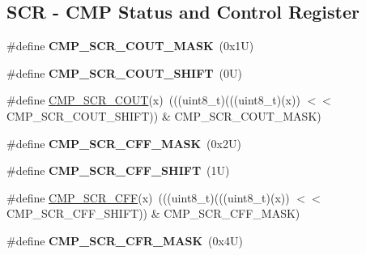 \subsection*{S\+CR -\/ C\+MP Status and Control Register}
\begin{DoxyCompactItemize}
\item 
\mbox{\label{group___c_m_p___register___masks_ga024aec72a28ecdc04a1441cd7a3af23a}} 
\#define {\bfseries C\+M\+P\+\_\+\+S\+C\+R\+\_\+\+C\+O\+U\+T\+\_\+\+M\+A\+SK}~(0x1\+U)
\item 
\mbox{\label{group___c_m_p___register___masks_gaa508076192a6b9aed5c4d46282c64394}} 
\#define {\bfseries C\+M\+P\+\_\+\+S\+C\+R\+\_\+\+C\+O\+U\+T\+\_\+\+S\+H\+I\+FT}~(0\+U)
\item 
\#define \mbox{\hyperlink{group___c_m_p___register___masks_gaff457b5ca15d0bc33dad1e49ac9793cf}{C\+M\+P\+\_\+\+S\+C\+R\+\_\+\+C\+O\+UT}}(x)~(((uint8\+\_\+t)(((uint8\+\_\+t)(x)) $<$$<$ C\+M\+P\+\_\+\+S\+C\+R\+\_\+\+C\+O\+U\+T\+\_\+\+S\+H\+I\+FT)) \& C\+M\+P\+\_\+\+S\+C\+R\+\_\+\+C\+O\+U\+T\+\_\+\+M\+A\+SK)
\item 
\mbox{\label{group___c_m_p___register___masks_gaab44e3da0576b12dd809881323944a1c}} 
\#define {\bfseries C\+M\+P\+\_\+\+S\+C\+R\+\_\+\+C\+F\+F\+\_\+\+M\+A\+SK}~(0x2\+U)
\item 
\mbox{\label{group___c_m_p___register___masks_ga076d455f0d5bdad02282cbcce6e04c01}} 
\#define {\bfseries C\+M\+P\+\_\+\+S\+C\+R\+\_\+\+C\+F\+F\+\_\+\+S\+H\+I\+FT}~(1\+U)
\item 
\#define \mbox{\hyperlink{group___c_m_p___register___masks_ga3cf21e20fb83bffcac05736f6f7c797d}{C\+M\+P\+\_\+\+S\+C\+R\+\_\+\+C\+FF}}(x)~(((uint8\+\_\+t)(((uint8\+\_\+t)(x)) $<$$<$ C\+M\+P\+\_\+\+S\+C\+R\+\_\+\+C\+F\+F\+\_\+\+S\+H\+I\+FT)) \& C\+M\+P\+\_\+\+S\+C\+R\+\_\+\+C\+F\+F\+\_\+\+M\+A\+SK)
\item 
\mbox{\label{group___c_m_p___register___masks_ga876bfa2799338c6b10b152940d25c4a7}} 
\#define {\bfseries C\+M\+P\+\_\+\+S\+C\+R\+\_\+\+C\+F\+R\+\_\+\+M\+A\+SK}~(0x4\+U)
\item 
\mbox{\label{group___c_m_p___register___masks_ga78595d16db987c96e73ce96fc5436f6b}} 

\end{DoxyCompactItemize}
